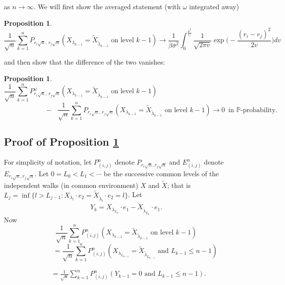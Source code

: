 \documentclass[11pt]{amsart}
\newtheorem{proposition}[theorem]{\sc Proposition}
\begin{document}
 as $ n \to \infty$. We will first show the averaged statement (with $\omega$ integrated away)

\bigskip

\begin{proposition} 
\label{STEP 1}
\[\frac{1}{\sqrt{n}} \sum_{k=1}^{n}P_{r_i \sqrt{n},\,r_j \sqrt{n}}
(X_{\lambda_{k-1}}= \tilde{X}_{\tilde{\lambda}_{k-1}} \mbox{ on level } k-1)\longrightarrow 
\frac{1}{\beta \overline{\sigma}^2}\int_0^{\frac{\overline{\sigma}^2}{c_1}} \frac{1}{\sqrt{2\pi v}} \exp\big( -\frac{(r_i-r_j)^2}{2v} \big) dv\]
\end{proposition}
 and then show that the difference of the two vanishes: 

\bigskip

\begin{proposition}
\label{STEP 2} 
 \[\frac{1}{\sqrt{n}} \sum_{k=1}^{n}P^{\omega}_{r_i \sqrt{n},\,r_j \sqrt{n}}
(X_{\lambda_{k-1}}= \tilde{X}_{\tilde{\lambda}_{k-1}} \mbox{ on level }k-1) \hspace{8cm} \]
\[\qquad \qquad \qquad - \mbox{ } \frac{1}{\sqrt{n}} \sum_{k=1}^{n}P_{r_i \sqrt{n},\,r_j \sqrt{n}}
(X_{\lambda_{k-1}}= \tilde{X}_{\tilde{\lambda}_{k-1}} \mbox{ on level }k-1) \longrightarrow 0 \,\,\, \mbox{in}\,\, \mathbb{P}\mbox{-probability}.\]
\end{proposition} 

\bigskip

\subsection{Proof of Proposition \ref{STEP 1}}
For simplicity of notation, let $P_{(i,j)}^n$ denote $P_{r_i \sqrt{n},r_j \sqrt{n}}$ and $E_{(i,j)}^n$ denote $E_{r_i \sqrt{n},r_j \sqrt{n}}$. Let $0=L_0<L_1< \cdots$ be the successive common levels of the independent walks (in common environment) $X$ and $\tilde{X}$; that is $L_j= \inf \{l>L_{j-1}:X_{\lambda_l}\cdot e_2=\tilde{X}_{\tilde{\lambda}_l} \cdot e_2 =l\}$. Let
\[Y_k=X_{\lambda_{L_k}}\cdot e_1-\tilde{X}_{\tilde{\lambda}_{L_k}}\cdot e_1.\]
 Now
\[
 \frac{1}{\sqrt{n}}  \sum_{k=1}^{n} P_{(i,j)}^n
 (X_{{\lambda}_{k-1}} = \tilde{X}_{\tilde{\lambda}_{k-1}}   \mbox{ on level } k-1 ) \]
\[
\qquad \, \, \, \,=\frac{1}{\sqrt{n}}  \sum_{k=1}^{n} P_{(i,j)}^n
(X_{{\lambda}_{L_{k-1}}} = \tilde{X}_{\tilde{\lambda}_{L_{k-1}} }  \mbox{ and } L_{k-1}
 \leq n-1 )  \]

\begin{eqnarray}
\label{eqn3}
\,\,\,\,=\frac{1}{\sqrt{n}}  \sum_{k=1}^{n} P_{(i,j)}^n(Y_{k-1}=0  \mbox{ and } L_{k-1} \leq n-1 ).
\end{eqnarray}
\end{document}
